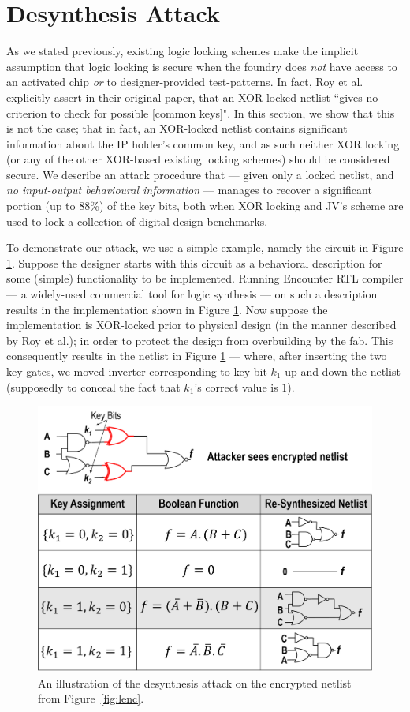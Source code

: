 \section{Desynthesis Attack}

As we stated previously, existing logic locking schemes make the implicit assumption that logic locking is secure when the foundry does \emph{not} have access to an activated chip \emph{or} to designer-provided test-patterns. In fact, Roy et al. explicitly assert in their original paper, that an XOR-locked netlist ``gives no criterion to check for possible [common keys]"\cite{}.  In this section, we show that this is not the case; that in fact, an XOR-locked netlist contains significant information about the IP holder's common key, and as such neither XOR locking (or any of the other XOR-based existing locking schemes) should be considered secure. We describe an attack procedure that --- given only a locked netlist, and \emph{no input-output behavioural information} --- manages to recover a significant portion  (up to 88\%) of the key bits, both when XOR locking and JV's scheme are used to lock a collection of digital design benchmarks. 

To demonstrate our attack, we use a simple example, namely the circuit in Figure \ref{}. Suppose the designer starts with this circuit as a behavioral description for some (simple) functionality to be implemented. Running Encounter RTL compiler --- a widely-used \cite{} commercial tool for logic synthesis --- on such a description results in the implementation shown in Figure \ref{}. Now suppose the implementation is XOR-locked prior to physical design (in the manner described by Roy et al.); in order to protect the design from overbuilding by the fab. This consequently results in the netlist in Figure \ref{} --- where, after inserting the two key gates, we moved inverter corresponding to key bit $k_1$ up and down the netlist (supposedly to conceal the fact that $k_1$'s correct value is $1$).

\begin{figure}%
\centering
\includegraphics[width=0.4\columnwidth]{./figs/desynth.png}
\caption{An illustration of the desynthesis attack on the encrypted netlist from Figure~\ref{fig:lenc}. 
}
\label{fig:desynth}
\end{figure}

